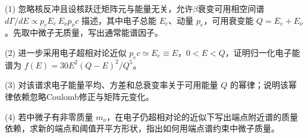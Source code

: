 (1) 忽略核反冲且设核跃迁矩阵元与能量无关，允许\(\beta \)衰变可用相空间谱 \(d\Gamma/dE\propto p_eE_e\,E_\nu p_\nu c\) 描述，其中电子总能 \(E_e\)、动量 \(p_e\)，可用衰变能 \(Q=E_e+E_\nu\)。先取中微子无质量，写出通常能谱因子。

(2) 进一步采用电子超相对论近似 \(p_ec\simeq E_e\equiv E\)，\(0<E<Q\)，证明归一化电子能谱为 \(f(E)=30E^2(Q-E)^2/Q^5\)。

(3) 对该谱求电子能量平均、方差和总衰变率关于可用能量 \(Q\) 的幂律；说明该幂律依赖忽略Coulomb修正与矩阵元变化。

(4) 若中微子有非零质量 \(m_\nu\)，在电子仍超相对论的近似下写出端点附近谱的质量依赖，求新的端点和阈值开平方形状，指出如何用端点谱约束中微子质量。
